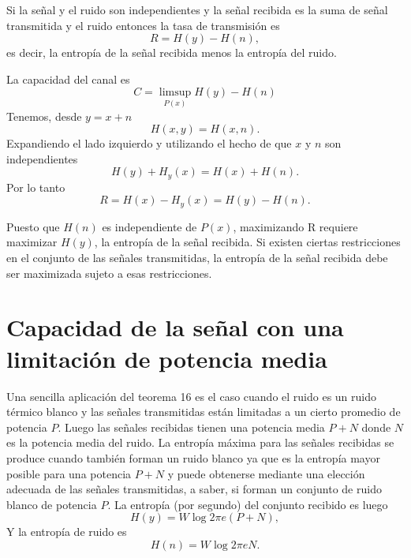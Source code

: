 \begin{theorem}	
\label{t16}
Si la se\~nal y el ruido son independientes y la se\~nal recibida es
la suma de se\~nal transmitida y el ruido entonces la tasa de
transmisi\'on es
\begin{equation}
R = H(y) - H(n),
\end{equation}
es decir, la entrop\'ia de la se\~nal recibida menos la entrop\'ia del
ruido.
\end{theorem}

La capacidad del canal es
\begin{equation}
C = \limsup_{P(x)} H(y) - H(n)
\end{equation}
Tenemos, desde $y = x+n$
\begin{equation}
H(x,y) = H(x,n).
\end{equation}
Expandiendo el lado izquierdo y utilizando el hecho de que $x$ y $n$
son independientes
\begin{equation}
H(y) + H_{y}(x) = H(x) + H(n).
\end{equation}
Por lo tanto
\begin{equation}
R = H(x) - H_{y}(x) = H(y) - H(n).
\end{equation}
	
Puesto que $H(n)$ es independiente de $P(x)$, maximizando R requiere
maximizar $H(y)$, la entrop\'ia de la se\~nal recibida. Si existen
ciertas restricciones en el conjunto de las se\~nales transmitidas, la
entrop\'ia de la se\~nal recibida debe ser maximizada sujeto a esas
restricciones.
	
\clearpage

\section{Capacidad de la se\~nal  con una limitaci\'on de potencia media}
\label{s25}

Una sencilla aplicaci\'on del teorema 16 es el caso cuando el ruido es
un ruido t\'ermico blanco y las se\~nales transmitidas est\'an
limitadas a un cierto promedio de potencia $P$. Luego las se\~nales
recibidas tienen una potencia media $P + N$ donde $N$ es la potencia
media del ruido. La entrop\'ia m\'axima para las se\~nales recibidas
se produce cuando tambi\'en forman un ruido blanco ya que es la
entrop\'ia mayor posible para una potencia $P + N$ y puede obtenerse
mediante una elecci\'on adecuada de las se\~nales transmitidas, a
saber, si forman un conjunto de ruido blanco de potencia $P$. La
entrop\'ia (por segundo) del conjunto recibido es luego
\begin{equation}
H(y) = W\log 2\pi e(P+N),
\end{equation}
Y la entrop\'ia de ruido es
\begin{equation}
H(n) = W\log 2\pi eN.
\end{equation}
	
